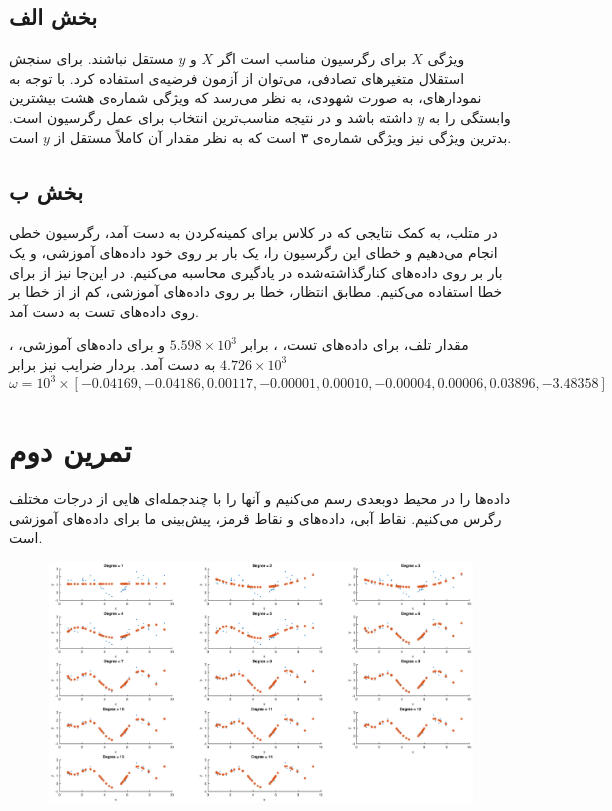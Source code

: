 \documentclass[a4paper]{article}
\begin{document}
\subsection{بخش الف}
ویژگی $X$ برای رگرسیون مناسب است اگر $X$ و $y$ مستقل نباشند. برای سنجش استقلال متغیر‌های تصادفی، می‌توان از آزمون فرضیه‌ی 
استفاده کرد. با توجه به نمودار‌های، به صورت شهودی، به نظر می‌رسد که ویژگی شماره‌ی هشت بیشترین وابستگی را به $y$ داشته باشد و در نتیجه مناسب‌ترین انتخاب برای عمل رگرسیون است. بدترین ویژگی نیز ویژگی شماره‌ی ۳ است که به نظر مقدار‌ آن کاملاً مستقل از $y$ است.

\subsection{بخش ب}
 در متلب، به کمک نتایجی که در کلاس برای کمینه‌کردن 
 به دست آمد، رگرسیون خطی انجام می‌دهیم و خطای این رگرسیون را، یک بار بر روی خود داده‌های آموزشی، و یک بار بر روی داده‌های کنار‌گذاشته‌شده در یادگیری محاسبه می‌کنیم. در این‌جا نیز از 
  برای خطا استفاده می‌کنیم. مطابق انتظار، خطا بر روی داده‌های آموزشی، کم از از خطا بر روی داده‌های تست به دست آمد.


مقدار تلف، برای داده‌های تست، 
،
برابر
$5.598\times10^3$
و برای داده‌های آموزشی،
،
$4.726\times10^3$
به دست آمد. بردار ضرایب نیز برابر
$$
\omega =
10^3 \times
[-0.04169,
-0.04186,
0.00117,
-0.00001,
0.00010,
-0.00004,
0.00006,
0.03896,
-3.48358]$$


\section{تمرین دوم}
داده‌‌ها را در محیط دوبعدی رسم می‌کنیم و آنها را با چند‌جمله‌ای هایی از درجات مختلف رگرس می‌کنیم. نقاط آبی، داده‌های و نقاط قرمز، پیش‌بینی ما برای داده‌های آموزشی است.
\begin{figure}[h]
	\centering
	\includegraphics[width=\textwidth, height=0.4\textheight]{15.eps}
\end{figure}
\end{document}
